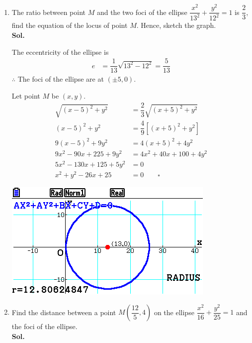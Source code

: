 \documentclass{report}
\newcommand{\sol}{\vspace{1em}\\\textbf{Sol.}}
\newcommand{\eos}{ \qquad \square}
\begin{document}
\begin{enumerate}[leftmargin=*]
    \item The ratio between point $M$ and the two foci of the ellipse $\dfrac{x^2}{13^2}
              + \dfrac{y^2}{12^2} = 1$ is $\dfrac{2}{3}$, find the equation of the locus of
          point $M$. Hence, sketch the graph. \sol{}

          The eccentricity of the ellipse is
          \begin{align*}
              e & = \dfrac{1}{13}\sqrt{13^2 - 12^2} = \dfrac{5}{13}
          \end{align*}
          $\therefore$ The foci of the ellipse are at $(\pm 5, 0)$.

          Let point $M$ be $(x, y)$.
          \begin{align*}
              \sqrt{(x - 5)^2 + y^2}   & = \dfrac{2}{3}\sqrt{(x + 5)^2 + y^2} \\
              (x - 5)^2 + y^2          & = \dfrac{4}{9}[(x + 5)^2 + y^2]      \\
              9(x - 5)^2 + 9y^2        & = 4(x+5)^2 + 4y^2                    \\
              9x^2 - 90x + 225 + 9y^2  & = 4x^2 + 40x + 100 + 4y^2            \\
              5x^2 - 130x + 125 + 5y^2 & = 0                                  \\
              x^2 + y^2 - 26x + 25     & = 0 \eos
          \end{align*}
          \vspace{1em}
          \begin{center}
              \includegraphics[scale=0.5]{./assets/ex5c3.png}
          \end{center}

          \newpage
    \item Find the distance between a point $M\left(\dfrac{12}{5}, 4\right)$ on the
          ellipse $\dfrac{x^2}{16} + \dfrac{y^2}{25} = 1$ and the foci of the ellipse.
          \sol{}


\end{enumerate}
\end{document}
